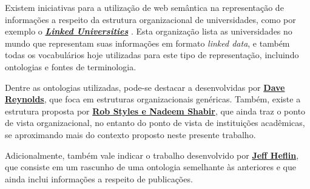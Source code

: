 
Existem iniciativas para a utilização de web semântica na representação de informações a respeito da estrutura organizacional de universidades, como por exemplo o \href{http://linkeduniversities.org/lu/index.php/vocabularies/index.html}{\textbf{\textit{Linked Universities}}} . Esta organização lista as universidades no mundo que representam suas informações em formato \textit{linked data}, e também todas os vocabulários hoje utilizadas para este tipo de representação, incluindo ontologias e fontes de terminologia.

Dentre as ontologias utilizadas, pode-se destacar a desenvolvidas por \href{http://www.epimorphics.com/public/vocabulary/org.html}{\textbf{Dave Reynolds}}, que foca em estruturas organizacionais genéricas. Também, existe a estrutura proposta por \href{http://vocab.org/aiiso/schema}{\textbf{Rob Styles e Nadeem Shabir}}, que ainda traz o ponto de vista organizacional, no entanto do ponto de vista de instituições acadêmicas, se aproximando mais do contexto proposto neste presente trabalho.

Adicionalmente, também vale indicar o trabalho desenvolvido por \href{https://www.cs.umd.edu/projects/plus/SHOE/onts/univ1.0.html}{\textbf{Jeff Heflin}}, que consiste em um rascunho de uma ontologia semelhante às anteriores e que ainda inclui informações a respeito de publicações. 